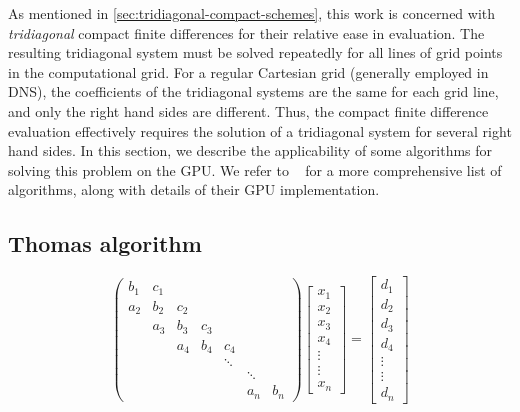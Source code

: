 As mentioned in \ref{sec:tridiagonal-compact-schemes},
this work is concerned with
\emph{tridiagonal} compact finite differences
for their relative ease in evaluation.
The resulting tridiagonal system must be solved
repeatedly for all lines of grid points in the computational grid.
For a regular Cartesian grid (generally employed in DNS),
the coefficients of the tridiagonal systems
are the same for each grid line,
and only the right hand sides are different.
Thus, the compact finite difference evaluation
effectively requires the solution of a tridiagonal system
for several right hand sides.
In this section,
we describe the applicability of some algorithms
for solving this problem on the GPU.
We refer to ~\cite{chang2014guide} for
a more comprehensive list of algorithms,
along with details of their GPU implementation.

\subsection{Thomas algorithm}

\begin{equation} \label{eqn:general-tridiagonal-system}
\begin{pmatrix}
     b_1 & c_1  \\
     a_2 & b_2  &  c_2  \\
         & a_3  &  b_3 &  c_3  \\
         &      &  a_4 &  b_4 &  c_4  \\
         &      &      &      &  \ddots \\
         &      &      &      &     &  \ddots  \\
         &      &      &      &     &  a_n  &  b_n
\end{pmatrix}
\begin{bmatrix}
    x_1 \\
    x_2 \\
    x_3 \\
    x_4 \\
    \vdots \\
    \vdots \\
    x_n
 \end{bmatrix}
=
\begin{bmatrix}
   d_1 \\
   d_2 \\
   d_3 \\
   d_4 \\
   \vdots \\
   \vdots \\
   d_{n}
\end{bmatrix}
\end{equation}

